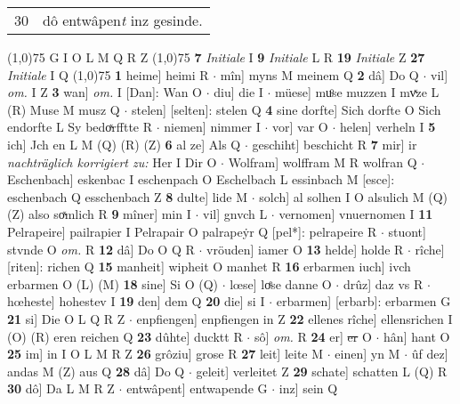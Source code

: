 \documentclass[8pt,a4paper,notitlepage]{article}
\begin{document}
\begin{table}[ht]
\begin{minipage}[t]{0.5\linewidth}
\begin{tabular}{rl}
30 & dô entwâpen\textit{t} inz gesinde.\\ 
\end{tabular}
\scriptsize
\line(1,0){75} \newline
G I O L M Q R Z \newline
\line(1,0){75} \newline
\textbf{7} \textit{Initiale} I  \textbf{9} \textit{Initiale} L R  \textbf{19} \textit{Initiale} Z  \textbf{27} \textit{Initiale} I Q  \newline
\line(1,0){75} \newline
\textbf{1} heime] heimi R  $\cdot$ mîn] myns M meinem Q \textbf{2} dâ] Do Q  $\cdot$ vil] \textit{om.} I Z \textbf{3} wan] \textit{om.} I [Dan]: Wan O  $\cdot$ diu] die I  $\cdot$ müese] muͦse muzzen I mvͯze L (R) Muse M musz Q  $\cdot$ stelen] [selten]: stelen Q \textbf{4} sine dorfte] Sich dorfte O Sich endorfte L Sy bedoͯrfftte R  $\cdot$ niemen] nimmer I  $\cdot$ vor] var O  $\cdot$ helen] verheln I \textbf{5} ich] Jch en L M (Q) (R) (Z) \textbf{6} al ze] Als Q  $\cdot$ geschiht] beschicht R \textbf{7} mir] ir \textit{nachträglich korrigiert zu:} Her I Dir O  $\cdot$ Wolfram] wolffram M R wolfran Q  $\cdot$ Eschenbach] eskenbac I eschenpach O Eschelbach L essinbach M [esce]: eschenbach Q esschenbach Z \textbf{8} dulte] lide M  $\cdot$ solch] al solhen I O alsulich M (Q) (Z) also soͯmlich R \textbf{9} mîner] min I  $\cdot$ vil] gnvch L  $\cdot$ vernomen] vnuernomen I \textbf{11} Pelrapeire] pailrapier I Pelrapair O palrapeẏr Q [pel*]: pelrapeire R  $\cdot$ stuont] stvnde O \textit{om.} R \textbf{12} dâ] Do O Q R  $\cdot$ vröuden] iamer O \textbf{13} helde] holde R  $\cdot$ rîche] [riten]: richen Q \textbf{15} manheit] wipheit O manhet R \textbf{16} erbarmen iuch] ivch erbarmen O (L) (M) \textbf{18} sine] Si O (Q)  $\cdot$ lœse] loͤse danne O  $\cdot$ drûz] daz vs R  $\cdot$ hœheste] hohestev I \textbf{19} den] dem Q \textbf{20} die] si I  $\cdot$ erbarmen] [erbarb]: erbarmen G \textbf{21} si] Die O L Q R Z  $\cdot$ enpfiengen] enpfiengen in Z \textbf{22} ellenes rîche] ellensrichen I (O) (R) eren reichen Q \textbf{23} dûhte] ducktt R  $\cdot$ sô] \textit{om.} R \textbf{24} er] \sout{er} O  $\cdot$ hân] hant O \textbf{25} im] in I O L M R Z \textbf{26} grôziu] grose R \textbf{27} leit] leite M  $\cdot$ einen] yn M  $\cdot$ ûf dez] andas M (Z) aus Q \textbf{28} dâ] Do Q  $\cdot$ geleit] verleitet Z \textbf{29} schate] schatten L (Q) R \textbf{30} dô] Da L M R Z  $\cdot$ entwâpent] entwapende G  $\cdot$ inz] sein Q \newline
\end{minipage}

\end{table}
\end{document}
